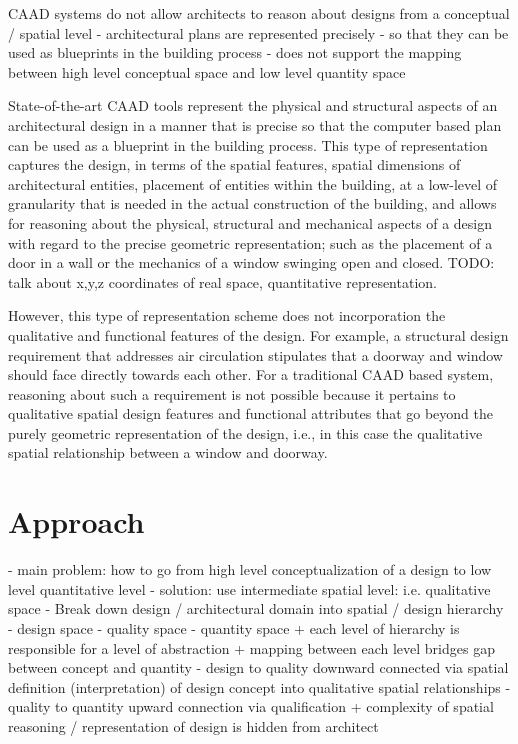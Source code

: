 \documentclass[12pt]{ucthesis}
\begin{document}
  
CAAD systems do not allow architects to reason about designs from a conceptual / spatial level
  - architectural plans are represented precisely 
      - so that they can be used as blueprints in the building process
  - does not support the mapping between high level conceptual space and low level quantity space

State-of-the-art CAAD tools represent the physical and structural aspects of an architectural design in a manner that is precise so that the computer based plan can be used as a blueprint in the building process. This type of representation captures the design, in terms of the spatial features, spatial dimensions of architectural entities, placement of entities within the building, at a low-level of granularity that is needed in the actual construction of the building, and allows for reasoning about the physical, structural and mechanical aspects of a design with regard to the precise geometric representation; such as the placement of a door in a wall or the mechanics of a window swinging open and closed. TODO: talk about x,y,z coordinates of real space, quantitative representation.

However, this type of representation scheme does not incorporation the qualitative and functional features of the design. For example, a structural design requirement that addresses air circulation stipulates that a doorway and window should face directly towards each other. For a traditional CAAD based system, reasoning about such a requirement is not possible because it pertains to qualitative spatial design features and functional attributes that go beyond the purely geometric representation of the design, i.e., in this case the qualitative spatial relationship between a window and doorway.


\section{Approach}
  - main problem: how to go from high level conceptualization of a design to low level quantitative level
  - solution: use intermediate spatial level: i.e. qualitative space
  	  - Break down design / architectural domain into spatial / design hierarchy
         - design space
         - quality space
         - quantity space
         + each level of hierarchy is responsible for a level of abstraction
         + mapping between each level bridges gap between concept and quantity
         	- design to quality downward connected via spatial definition (interpretation) of design concept into qualitative spatial relationships
         	- quality to quantity upward connection via qualification
         + complexity of spatial reasoning / representation of design is hidden from architect
      
\end{document}
